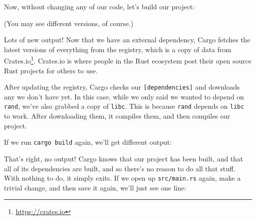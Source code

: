 \documentclass[a4paper,]{book}
\newenvironment{Shaded}{\begin{snugshade}}{\end{snugshade}}
\newcommand{\KeywordTok}[1]{\textcolor[rgb]{0.13,0.29,0.53}{\textbf{{#1}}}}
\newcommand{\NormalTok}[1]{{#1}}
\renewcommand{\href}[2]{#2\footnote{\url{#1}}}
\begin{document}
Now, without changing any of our code, let's build our project:

\begin{Shaded}
\end{Shaded}

(You may see different versions, of course.)

Lots of new output! Now that we have an external dependency, Cargo
fetches the latest versions of everything from the registry, which is a
copy of data from \href{https://crates.io}{Crates.io}. Crates.io is
where people in the Rust ecosystem post their open source Rust projects
for others to use.

After updating the registry, Cargo checks our
\texttt{{[}dependencies{]}} and downloads any we don't have yet. In this
case, while we only said we wanted to depend on \texttt{rand}, we've
also grabbed a copy of \texttt{libc}. This is because \texttt{rand}
depends on \texttt{libc} to work. After downloading them, it compiles
them, and then compiles our project.

If we run \texttt{cargo\ build} again, we'll get different output:

\begin{Shaded}
\end{Shaded}

That's right, no output! Cargo knows that our project has been built,
and that all of its dependencies are built, and so there's no reason to
do all that stuff. With nothing to do, it simply exits. If we open up
\texttt{src/main.rs} again, make a trivial change, and then save it
again, we'll just see one line:

\begin{Shaded}
\end{Shaded}
\end{document}
